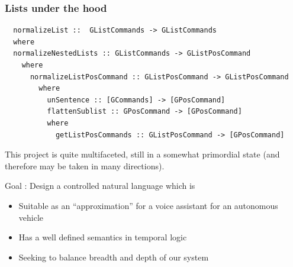\documentclass{beamer}
\begin{document}
\begin{frame}[fragile]
\frametitle{Lists under the hood}
\begin{verbatim}
  normalizeList ::  GListCommands -> GListCommands
  where
  normalizeNestedLists :: GListCommands -> GListPosCommand
    where
      normalizeListPosCommand :: GListPosCommand -> GListPosCommand
        where
          unSentence :: [GCommands] -> [GPosCommand]
          flattenSublist :: GPosCommand -> [GPosCommand]
          where
            getListPosCommands :: GListPosCommand -> [GPosCommand]
\end{verbatim}
\end{frame}








\begin{frame}

\begin{exampleblock}{}
This project is quite multifaceted, still in a somewhat primordial state (and therefore may be taken in many directions).
\end{exampleblock}

\begin{block}{}
Goal : Design a controlled natural language which is 
\end{block}

\begin{itemize}
\item Suitable as an ``approximation'' for a voice assistant for an autonomous vehicle
\item Has a well defined semantics in temporal logic
\item Seeking to balance breadth and depth of our system
\end{itemize}

\end{frame}
\end{document}
